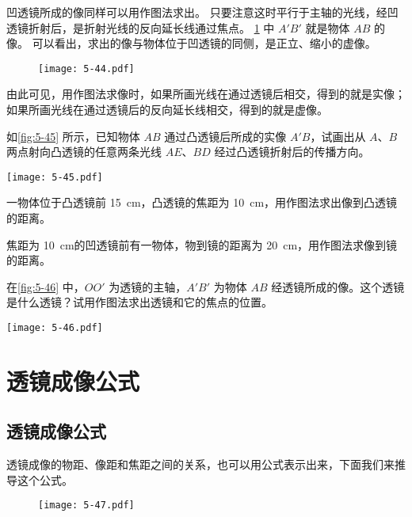 凹透镜所成的像同样可以用作图法求出。
只要注意这时平行于主轴的光线，经凹透镜折射后，是折射光线的反向延长线通过焦点。
\cref{fig:5-44} 中 $A'B'$ 就是物体 $AB$ 的像。
可以看出，求出的像与物体位于凹透镜的同侧，是正立、缩小的虚像。

\begin{figure}
  \texttt{[image: 5-44.pdf]}
  \caption{}\label{fig:5-44}
\end{figure}

由此可见，用作图法求像时，如果所画光线在通过透镜后相交，得到的就是实像；如果所画光线在通过透镜后的反向延长线相交，得到的就是虚像。

\begin{Practice}
\begin{question}
  \item 如\cref{fig:5-45} 所示，已知物体 $AB$ 通过凸透镜后所成的实像 $A'B$，试画出从 $A$、$B$ 两点射向凸透镜的任意两条光线 $AE$、$BD$ 经过凸透镜折射后的传播方向。
  \begin{figurehere}
    \begin{minipage}{\linewidth}\centering
      \texttt{[image: 5-45.pdf]}
      \caption{}\label{fig:5-45}
    \end{minipage}
  \end{figurehere}
  \item 一物体位于凸透镜前 \qty{15}{cm}，凸透镜的焦距为 \qty{10}{cm}，用作图法求出像到凸透镜的距离。
  \item 焦距为 \qty{10}{cm}的凹透镜前有一物体，物到镜的距离为 \qty{20}{cm}，用作图法求像到镜的距离。
  \item 在\cref{fig:5-46} 中，$OO'$ 为透镜的主轴，$A'B'$ 为物体 $AB$ 经透镜所成的像。这个透镜是什么透镜？试用作图法求出透镜和它的焦点的位置。                    
  \begin{figurehere}
    \begin{minipage}{\linewidth}\centering
      \texttt{[image: 5-46.pdf]}
      \caption{}\label{fig:5-46}
    \end{minipage}
  \end{figurehere}
\end{question}
\end{Practice}

\section{透镜成像公式}
\subsection{透镜成像公式}
透镜成像的物距、像距和焦距之间的关系，也可以用公式表示出来，下面我们来推导这个公式。
\begin{figure}
  \texttt{[image: 5-47.pdf]}
  \caption{}\label{fig:5-47}
\end{figure}

